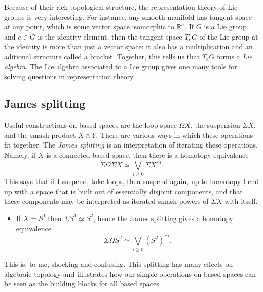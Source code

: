 \documentclass[10pt]{amsart}
\theoremstyle{definition}
\newcommand{\cdef}[1]{\textcolor{Bittersweet}{#1}}
\begin{document}
Because of their rich topological structure, the representation theory of Lie groups is very interesting. For instance, any smooth manifold has tangent space at any point, which is some vector space isomorphic to $\mathbb{R}^n$. If $G$ is a Lie group and $e \in G$ is the identity element, then the tangent space $T_eG$ of the Lie group at the identity is more than just a vector space: it also has a multiplication and an aditional structure called a bracket. Together, this tells us that $T_eG$ forms a \cdef{\emph{Lie algebra}}. The Lie algebra associated to a Lie group gives one many tools for solving questions in representation theory.


\subsection*{James splitting}
Useful constructions on based spaces are the loop space $\Omega X$, the suspension $\Sigma X$, and the smash product $X \wedge Y$. There are various ways in which these operations fit together. The \cdef{\emph{James splitting}} is an interpretation of iterating these operations. Namely, if $X$ is a connected based space, then there is a homotopy equivalence
\[
\Sigma\Omega\Sigma X \simeq \bigvee_{i \geq 0} \Sigma X^{\wedge i}.
\]
This says that if I suspend, take loops, then suspend again, up to homotopy I end up with a space that is built out of essentially disjoint components, and that these components may be interpreted as iterated smash powers of $\Sigma X$ with itself. 
\begin{itemize}
    \item If $X = S^1$,then $\Sigma S^1 \simeq S^2$, hence the James splitting gives a homotopy equivalence
    \[
    \Sigma \Omega S^2 \simeq \bigvee_{i \geq 0} (S^2)^{\wedge i}.
    \]
\end{itemize}
This is, to me, shocking and confusing. This splitting has many effects on algebraic topology and illustrates how our simple operations on based spaces can be seen as the building blocks for all based spaces.
\end{document}

